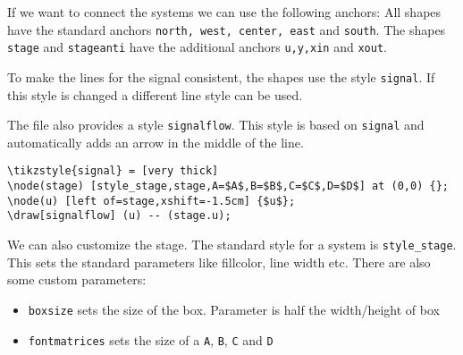 \documentclass[inputenc=utf8,fontsize=10pt]{article}
\begin{document}
If we want to connect the systems we can use the following anchors:
All shapes have the standard anchors \texttt{north, west, center, east} and \texttt{south}.
The shapes \texttt{stage} and \texttt{stageanti} have the additional anchors 
\texttt{u,y,xin} and \texttt{xout}.


To make the lines for the signal consistent, the shapes use the style \texttt{signal}.
If this style is changed a different line style can be used.

The file also provides a style \texttt{signalflow}. This style is based on \texttt{signal} and automatically adds an arrow in the middle of the line.


\begin{verbatim}
\tikzstyle{signal} = [very thick]
\node(stage) [style_stage,stage,A=$A$,B=$B$,C=$C$,D=$D$] at (0,0) {};
\node(u) [left of=stage,xshift=-1.5cm] {$u$};
\draw[signalflow] (u) -- (stage.u);
\end{verbatim}

We can also customize the stage.
The standard style for a system is \verb|style_stage|. This sets the standard parameters like fillcolor, line width etc.
There are also some custom parameters:
\begin{itemize}
	\item \verb|boxsize| sets the size of the box. Parameter is half the width/height of box 
	\item \verb|fontmatrices| sets the size of a \texttt{A}, \texttt{B}, \texttt{C} and \texttt{D}
\end{itemize}
\end{document}
